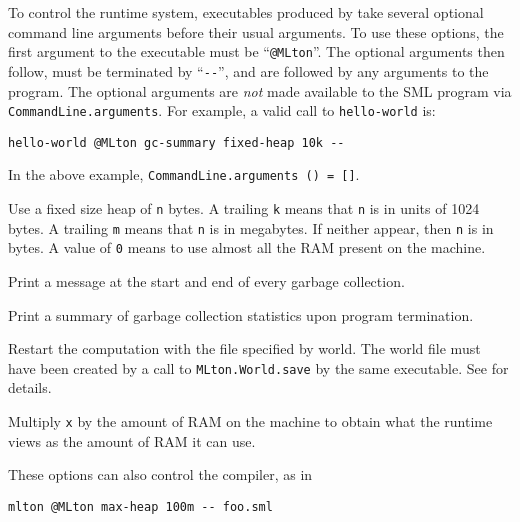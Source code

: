 
To control the runtime system, executables produced by {\mlton} take
several optional command line arguments before their usual arguments.
To use these options, the first argument to the executable must be
``\verb+@MLton+''.  The optional arguments then follow, must be
terminated by ``\verb+--+'', and are followed by any arguments to the program.
The optional arguments are {\em not} made available to the SML
program via {\tt CommandLine.arguments}.  For example, a valid call
to {\tt hello-world} is: 
\begin{verbatim}
hello-world @MLton gc-summary fixed-heap 10k --
\end{verbatim}
In the above example, {\tt CommandLine.arguments () = []}.

\begin{description}
 Use a fixed size heap of {\tt n} bytes.
 A trailing {\tt k} means that {\tt n} is in units of 1024 bytes. 
 A trailing {\tt m} means that {\tt n} is in megabytes. 
 If neither appear, then {\tt n} is in bytes.
 A value of {\tt 0} means to use almost all the RAM present on the
 machine.

Print a message at the start and end of every garbage collection.

Print a summary of garbage collection statistics upon program
termination.

Restart the computation with the file specified by world.
The world file must have been created by a call to
{\tt MLton.World.save} by the same executable.  See 
for details.


Multiply {\tt x} by the amount of RAM on the machine to obtain what
the runtime views as the amount of RAM it can use.
\end{description}
These options can also control the compiler, as in
\begin{verbatim}
mlton @MLton max-heap 100m -- foo.sml
\end{verbatim}
